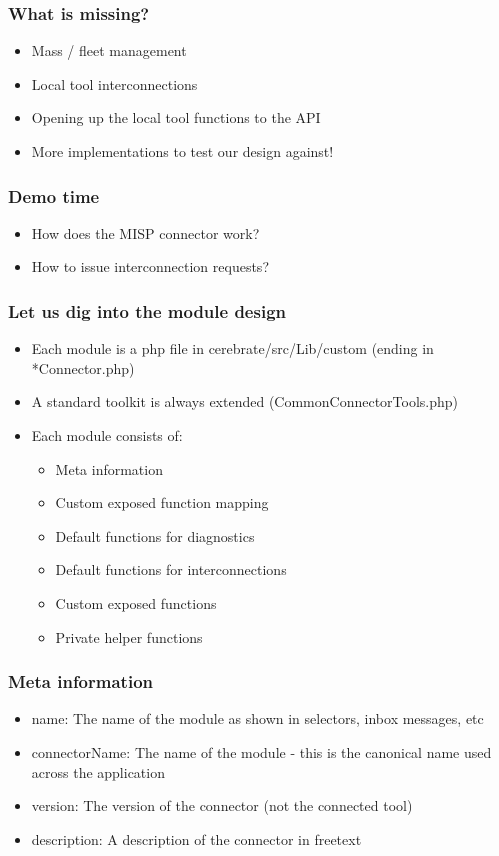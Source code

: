 \begin{frame}
	\frametitle{What is missing?}
	\begin{itemize}
                \item Mass / fleet management
                \item Local tool interconnections
                \item Opening up the local tool functions to the API
                \item More implementations to test our design against!
	\end{itemize}
\end{frame}

\begin{frame}
	\frametitle{Demo time}
	\begin{itemize}
                \item How does the MISP connector work?
                \item How to issue interconnection requests?
	\end{itemize}
\end{frame}

\begin{frame}
	\frametitle{Let us dig into the module design}
	\begin{itemize}
                \item Each module is a php file in cerebrate/src/Lib/custom (ending in *Connector.php)
                \item A standard toolkit is always extended (CommonConnectorTools.php)
                \item Each module consists of:
         	\begin{itemize}
	                \item Meta information
                        \item Custom exposed function mapping
                        \item Default functions for diagnostics
                        \item Default functions for interconnections
                        \item Custom exposed functions
                        \item Private helper functions
		\end{itemize}
	\end{itemize}
\end{frame}

\begin{frame}
	\frametitle{Meta information}
	\begin{itemize}
                \item name: The name of the module as shown in selectors, inbox messages, etc
                \item connectorName: The name of the module - this is the canonical name used across the application
                \item version: The version of the connector (not the connected tool)
		\item description: A description of the connector in freetext
	\end{itemize}
\end{frame}

